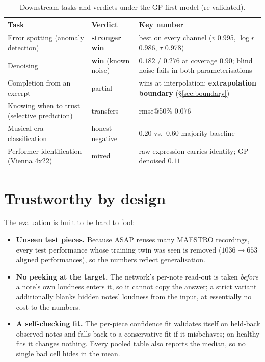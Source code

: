 \documentclass[11pt,a4paper]{report}
\begin{document}
\begin{table}[h]\centering
\caption{Downstream tasks and verdicts under the GP-first model (re-validated).}
\label{tab:downstream-glance}
\footnotesize
\begin{tabular}{@{}p{5.2cm}p{2.4cm}p{5.0cm}@{}}
\toprule
Task & Verdict & Key number \\
\midrule
Error spotting (anomaly detection) & \textbf{stronger win} & best on every channel ($v$ 0.995, $\log r$ 0.986, $\tau$ 0.978) \\
Denoising & \textbf{win} (known noise) & $0.182$ / $0.276$ at coverage $0.90$; blind noise fails in both parameterisations \\
Completion from an excerpt & partial & wins at interpolation; \textbf{extrapolation boundary} (\S\ref{sec:boundary}) \\
Knowing when to trust (selective prediction) & transfers & rmse@50\% $0.076$ \\
Musical-era classification & honest negative & $0.20$ vs.\ $0.60$ majority baseline \\
Performer identification (Vienna 4x22) & mixed & raw expression carries identity; GP-denoised $0.11$ \\
\bottomrule
\end{tabular}
\end{table}

\section{Trustworthy by design}
The evaluation is built to be hard to fool:
\begin{itemize}[leftmargin=*,noitemsep]
  \item \textbf{Unseen test pieces.} Because ASAP reuses many MAESTRO recordings,
        every test performance whose training twin was seen is removed
        ($1036\to653$ aligned performances), so the numbers reflect generalisation.
  \item \textbf{No peeking at the target.} The network's per-note read-out is taken
        \emph{before} a note's own loudness enters it, so it cannot copy the
        answer; a strict variant additionally blanks hidden notes' loudness from
        the input, at essentially no cost to the numbers.
  \item \textbf{A self-checking fit.} The per-piece confidence fit validates itself
        on held-back observed notes and falls back to a conservative fit if it
        misbehaves; on healthy fits it changes nothing. Every pooled table also
        reports the median, so no single bad cell hides in the mean.
\end{itemize}
\end{document}
